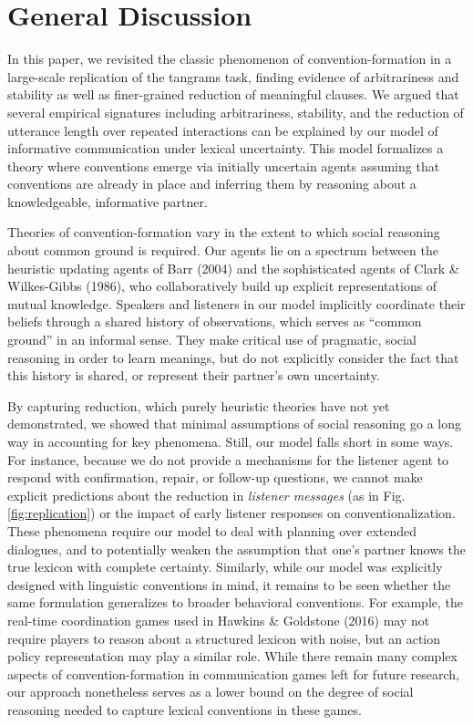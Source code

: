 \documentclass[manuscript]{stjour}
\begin{document}
\section{General Discussion}\label{general-discussion}

In this paper, we revisited the classic phenomenon of
convention-formation in a large-scale replication of the tangrams task,
finding evidence of arbitrariness and stability as well as finer-grained
reduction of meaningful clauses. We argued that several empirical
signatures including arbitrariness, stability, and the reduction of
utterance length over repeated interactions can be explained by our
model of informative communication under lexical uncertainty. This model
formalizes a theory where conventions emerge via initially uncertain
agents assuming that conventions are already in place and inferring them
by reasoning about a knowledgeable, informative partner.

Theories of convention-formation vary in the extent to which social
reasoning about common ground is required. Our agents lie on a spectrum
between the heuristic updating agents of Barr (2004) and the
sophisticated agents of Clark \& Wilkes-Gibbs (1986), who
collaboratively build up explicit representations of mutual knowledge.
Speakers and listeners in our model implicitly coordinate their beliefs
through a shared history of observations, which serves as ``common
ground'' in an informal sense. They make critical use of pragmatic,
social reasoning in order to learn meanings, but do not explicitly
consider the fact that this history is shared, or represent their
partner's own uncertainty.

By capturing reduction, which purely heuristic theories have not yet
demonstrated, we showed that minimal assumptions of social reasoning go
a long way in accounting for key phenomena. Still, our model falls short
in some ways. For instance, because we do not provide a mechanisms for
the listener agent to respond with confirmation, repair, or follow-up
questions, we cannot make explicit predictions about the reduction in
\emph{listener messages} (as in Fig. \ref{fig:replication}) or the
impact of early listener responses on conventionalization. These
phenomena require our model to deal with planning over extended
dialogues, and to potentially weaken the assumption that one's partner
knows the true lexicon with complete certainty. Similarly, while our
model was explicitly designed with linguistic conventions in mind, it
remains to be seen whether the same formulation generalizes to broader
behavioral conventions. For example, the real-time coordination games
used in Hawkins \& Goldstone (2016) may not require players to reason
about a structured lexicon with noise, but an action policy
representation may play a similar role. While there remain many complex
aspects of convention-formation in communication games left for future
research, our approach nonetheless serves as a lower bound on the degree
of social reasoning needed to capture lexical conventions in these
games.
\end{document}

